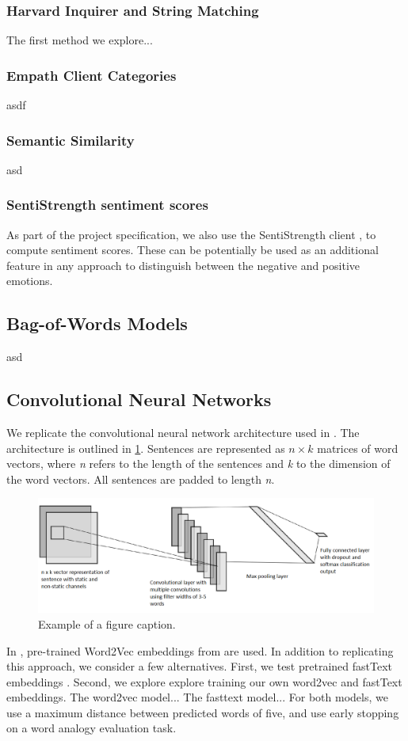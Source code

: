 \documentclass[conference]{IEEEtran}
\begin{document}
\subsubsection{Harvard Inquirer and String Matching}
The first method we explore...
\subsubsection{Empath Client Categories}
asdf
\subsubsection{Semantic Similarity}
asd
\subsubsection{SentiStrength sentiment scores}
As part of the project specification, we also use the SentiStrength client \cite{sentistrength}, to compute sentiment scores. These can be potentially be used as an additional feature in any approach to distinguish between the negative and positive emotions. 

\subsection{Bag-of-Words Models}
asd
\subsection{Convolutional Neural Networks}

We replicate the convolutional neural network architecture used in \cite{kim-2014-convolutional}. The architecture is outlined in \ref{fig1}. Sentences are represented as $n\times k$ matrices of word vectors, where \emph{n} refers to the length of the sentences and \emph{k} to the dimension of the word vectors. All sentences are padded to length \emph{n}.

\begin{figure}[htbp]
\centerline{\includegraphics[width = 0.5 \textwidth]{fig1.png}}
\caption{Example of a figure caption.}
\label{fig1}
\end{figure}

In \cite{kim-2014-convolutional}, pre-trained Word2Vec embeddings from \cite{mikolov2013distributed} \cite{bojanowski2016enriching} are used. In addition to replicating this approach, we consider a few alternatives. First, we test pretrained fastText embeddings . Second, we explore explore training our own word2vec and fastText embeddings.
The word2vec model...
The fasttext model...
 For both models, we use a maximum distance between predicted words of five, and use early stopping on a word analogy evaluation task. 
\end{document}
